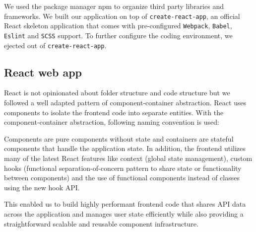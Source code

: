 We used the package manager \gls{npm} to organize third party libraries and frameworks. We built our application on top of \texttt{create-react-app}, an official React skeleton application that comes with pre-configured \texttt{Webpack}, \texttt{Babel}, \texttt{Eslint} and \texttt{SCSS} support. To further configure the coding environment, we ejected out of \texttt{create-react-app}.

\subsection*{React web app}
React is not opinionated about folder structure and code structure but we followed a well adapted pattern of component-container abstraction. React uses components to isolate the frontend code into separate entities. With the component-container abstraction, following naming convention is used: 

Components are pure components without state and containers are stateful components that handle the application state. In addition, the frontend utilizes many of the latest React features like context (global state management), custom hooks (functional separation-of-concern pattern to share state or functionality between components) and the use of functional components instead of classes using the new hook API. 

This enabled us to build highly performant frontend code that shares API data across the application and manages user state efficiently while also providing a straightforward scalable and reusable component infrastructure. 


